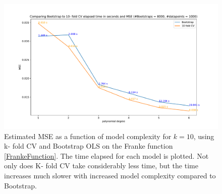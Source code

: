 \documentclass[11pt,a4paper,titlepage]{article}
\begin{document}
\begin{figure}[H]
\centering

\includegraphics[trim=2.0cm 0.9cm 2.7cm 1.2cm, clip=true,scale = 0.5]{KfoldVsBootstrap_k10_8kBootstraps_elapsedTime_comparison.pdf}
\caption[Comparing time elapsed from Bootstrap vs. K- fold CV]{Estimated MSE as a function of model complexity for $k=10$, using k- fold CV and Bootstrap OLS on the Franke function \eqref{FrankeFunction}. The time elapsed for each model is plotted. Not only does K- fold CV take considerably less time, but the time increases much slower with increased model complexity compared to Bootstrap.}\label{BootstrapVsKfold3}
\end{figure}
\end{document}
